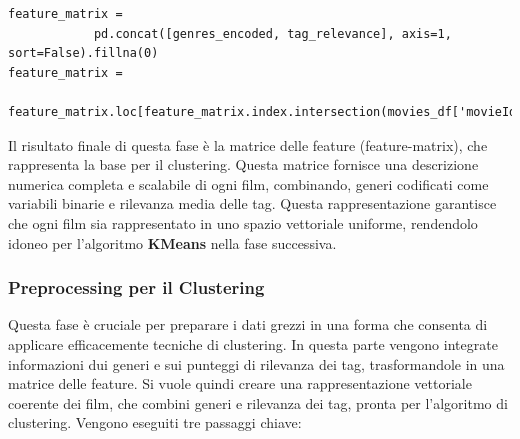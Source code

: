 \documentclass[a4paper,12pt]{article}
\begin{document}
\begin{enumerate}
\begin{verbatim}
feature_matrix = 
			pd.concat([genres_encoded, tag_relevance], axis=1, sort=False).fillna(0)
feature_matrix = 
			feature_matrix.loc[feature_matrix.index.intersection(movies_df['movieId'])]
\end{verbatim}
					Il risultato finale di questa fase è la matrice delle feature (feature-matrix), che rappresenta la base per il clustering. Questa matrice fornisce una descrizione numerica completa e scalabile di ogni film, combinando, generi codificati come variabili binarie e rilevanza media delle tag. Questa rappresentazione garantisce che ogni film sia rappresentato in uno spazio vettoriale uniforme, rendendolo idoneo per l'algoritmo \textbf{KMeans} nella fase successiva.

		\end{enumerate}

        \subsubsection{Preprocessing per il Clustering}
		Questa fase è cruciale per preparare i dati grezzi in una forma che consenta di applicare efficacemente tecniche di clustering. In questa parte vengono integrate informazioni dui generi e sui punteggi di rilevanza dei tag, trasformandole in una matrice delle feature. Si vuole quindi creare una rappresentazione vettoriale coerente dei film, che combini generi e rilevanza dei tag, pronta per l'algoritmo di clustering. Vengono eseguiti tre passaggi chiave: 
\end{document}
